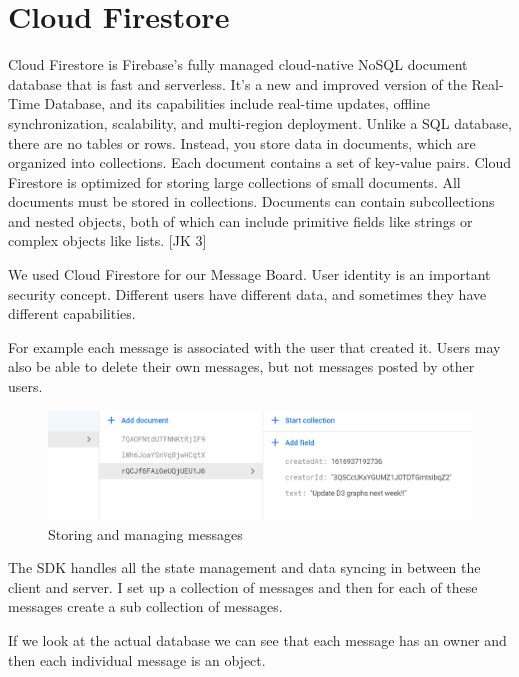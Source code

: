 \section{Cloud Firestore}
Cloud Firestore is Firebase's fully managed cloud-native NoSQL document database that is fast and serverless. It's a new and improved version of the Real-Time Database, and its capabilities include real-time updates, offline synchronization, scalability, and multi-region deployment. Unlike a SQL database, there are no tables or rows. Instead, you store data in documents, which are organized into collections. Each document contains a set of key-value pairs.
Cloud Firestore is optimized for storing large collections of small documents.
All documents must be stored in collections. Documents can contain subcollections and nested objects, both of which can include primitive fields like strings or complex objects like lists. [JK 3]

\vspace{6mm}

We used Cloud Firestore for our Message Board.
User identity is an important security concept. Different users have different data, and sometimes they have different capabilities.

For example each message is associated with the user that created it. Users may also be able to delete their own messages, but not messages posted by other users.

\begin{figure}[ht]
    \centering
    \includegraphics[scale=0.6]{img/FirestoreMessage.PNG}
    \caption{Storing and managing messages}
    \label{fig:my_labe6}
\end{figure}

The SDK handles all the state management and data syncing in between the client and server. I set up a collection of messages and then for each of these messages create a sub collection of messages.

\vspace{5mm}

If we look at the actual database we can see that each message has an owner and then each individual message is an object.

